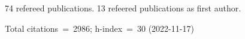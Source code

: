 74 refereed publications. 13 refeered publications as first author.

Total citations~=~2986; h-index~=~30 (2022-11-17)